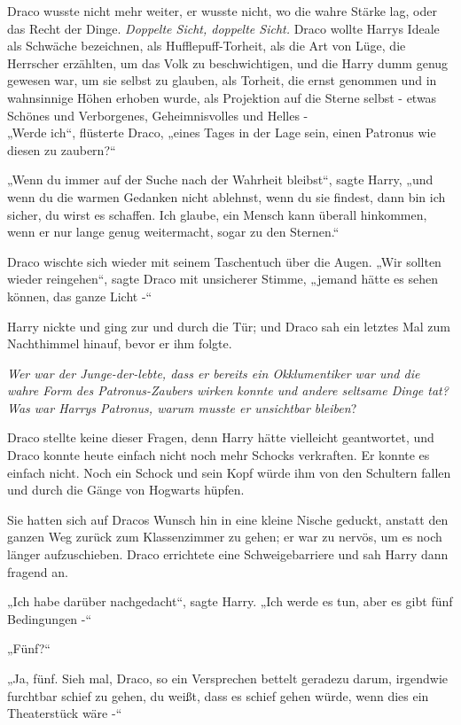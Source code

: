 {Draco wusste nicht mehr weiter, er wusste nicht, wo die wahre Stärke lag, oder das Recht der Dinge. \emph{Doppelte Sicht, doppelte Sicht.} Draco wollte Harrys Ideale als Schwäche bezeichnen, als Hufflepuff-Torheit, als die Art von Lüge, die Herrscher erzählten, um das Volk zu beschwichtigen, und die Harry dumm genug gewesen war, um sie selbst zu glauben, als Torheit, die ernst genommen und in wahnsinnige Höhen erhoben wurde, als Projektion auf die Sterne selbst - etwas Schönes und Verborgenes, Geheimnisvolles und Helles -\\ „Werde ich“, flüsterte Draco, „eines Tages in der Lage sein, einen Patronus wie diesen zu zaubern?“

„Wenn du immer auf der Suche nach der Wahrheit bleibst“, sagte Harry, „und wenn du die warmen Gedanken nicht ablehnst, wenn du sie findest, dann bin ich sicher, du wirst es schaffen. Ich glaube, ein Mensch kann überall hinkommen, wenn er nur lange genug weitermacht, sogar zu den Sternen.“

Draco wischte sich wieder mit seinem Taschentuch über die Augen. „Wir sollten wieder reingehen“, sagte Draco mit unsicherer Stimme, „jemand hätte es sehen können, das ganze Licht -“

Harry nickte und ging zur und durch die Tür; und Draco sah ein letztes Mal zum Nachthimmel hinauf, bevor er ihm folgte.

\emph{Wer war der Junge-der-lebte, dass er bereits ein Okklumentiker war und die wahre Form des Patronus-Zaubers wirken konnte und andere seltsame Dinge tat? Was war Harrys Patronus, warum musste er unsichtbar bleiben}?

Draco stellte keine dieser Fragen, denn Harry hätte vielleicht geantwortet, und Draco konnte heute einfach nicht noch mehr Schocks verkraften. Er konnte es einfach nicht. Noch ein Schock und sein Kopf würde ihm von den Schultern fallen und durch die Gänge von Hogwarts hüpfen.

Sie hatten sich auf Dracos Wunsch hin in eine kleine Nische geduckt, anstatt den ganzen Weg zurück zum Klassenzimmer zu gehen; er war zu nervös, um es noch länger aufzuschieben. Draco errichtete eine Schweigebarriere und sah Harry dann fragend an.

„Ich habe darüber nachgedacht“, sagte Harry. „Ich werde es tun, aber es gibt fünf Bedingungen -“

„Fünf?“

„Ja, fünf. Sieh mal, Draco, so ein Versprechen bettelt geradezu darum, irgendwie furchtbar schief zu gehen, du weißt, dass es schief gehen würde, wenn dies ein Theaterstück wäre -“

}
